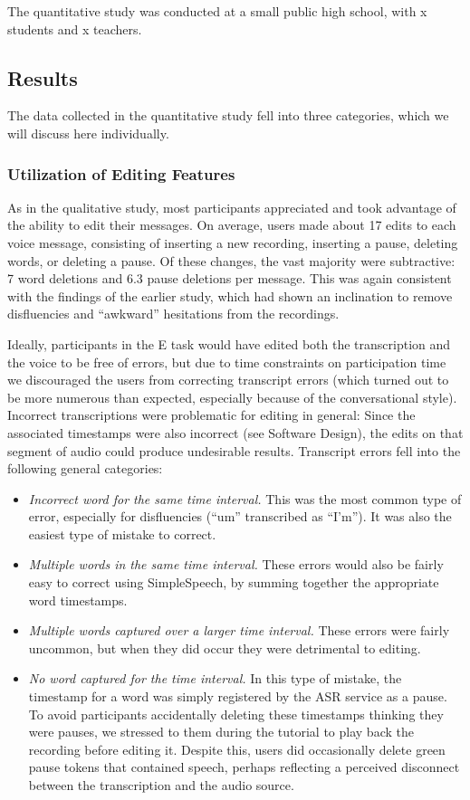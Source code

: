 The quantitative study was conducted at a small public high school, with x students and x teachers.

\subsection{Results}
The data collected in the quantitative study fell into three categories, which we will discuss here individually.

\subsubsection{Utilization of Editing Features}
As in the qualitative study, most participants appreciated and took advantage of the ability to edit their messages.
On average, users made about 17 edits to each voice message, consisting of inserting a new recording, inserting a pause, deleting words, or deleting a pause. 
Of these changes, the vast majority were subtractive: 7 word deletions and 6.3 pause deletions per message.
This was again consistent with the findings of the earlier study, which had shown an inclination to remove disfluencies and ``awkward'' hesitations from the recordings.

Ideally, participants in the E task would have edited both the transcription and the voice to be free of errors, but due to time constraints on participation time we discouraged the users from correcting transcript errors (which turned out to be more numerous than expected, especially because of the conversational style).
Incorrect transcriptions were problematic for editing in general: Since the associated timestamps were also incorrect (see Software Design), the edits on that segment of audio could produce undesirable results. 
Transcript errors fell into the following general categories:

\begin{itemize}
	\item \emph{Incorrect word for the same time interval.} 
	This was the most common type of error, especially for disfluencies (``um'' transcribed as ``I'm''). 
	It was also the easiest type of mistake to correct.
	\item \emph{Multiple words in the same time interval.}
	These errors would also be fairly easy to correct using SimpleSpeech, by summing together the appropriate word timestamps.
	\item \emph{Multiple words captured over a larger time interval.}
	These errors were fairly uncommon, but when they did occur they were detrimental to editing.
	\item \emph{No word captured for the time interval.}
	In this type of mistake, the timestamp for a word was simply registered by the ASR service as a pause.
	To avoid participants accidentally deleting these timestamps thinking they were pauses, we stressed to them during the tutorial to play back the recording before editing it. 
	Despite this, users did occasionally delete green pause tokens that contained speech, perhaps reflecting a perceived disconnect between the transcription and the audio source.
\end{itemize}

